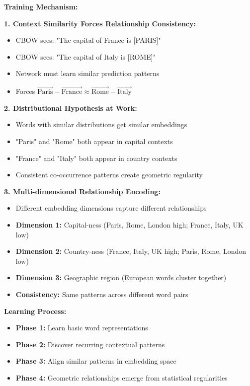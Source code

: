 \documentclass[12pt]{article}
\begin{document}
\begin{enumerate}[(a)]
{    \textbf{Training Mechanism:}
    
    \textbf{1. Context Similarity Forces Relationship Consistency:}
    \begin{itemize}
        \item CBOW sees: "The capital of France is [PARIS]"
        \item CBOW sees: "The capital of Italy is [ROME]"
        \item Network must learn similar prediction patterns
        \item Forces $\vec{\text{Paris}} - \vec{\text{France}} \approx \vec{\text{Rome}} - \vec{\text{Italy}}$
    \end{itemize}
    
    \textbf{2. Distributional Hypothesis at Work:}
    \begin{itemize}
        \item Words with similar distributions get similar embeddings
        \item "Paris" and "Rome" both appear in capital contexts
        \item "France" and "Italy" both appear in country contexts
        \item Consistent co-occurrence patterns create geometric regularity
    \end{itemize}
    
    \textbf{3. Multi-dimensional Relationship Encoding:}
    \begin{itemize}
        \item Different embedding dimensions capture different relationships
        \item \textbf{Dimension 1:} Capital-ness (Paris, Rome, London high; France, Italy, UK low)
        \item \textbf{Dimension 2:} Country-ness (France, Italy, UK high; Paris, Rome, London low)
        \item \textbf{Dimension 3:} Geographic region (European words cluster together)
        \item \textbf{Consistency:} Same patterns across different word pairs
    \end{itemize}
    
    \textbf{Learning Process:}
    \begin{itemize}
        \item \textbf{Phase 1:} Learn basic word representations
        \item \textbf{Phase 2:} Discover recurring contextual patterns
        \item \textbf{Phase 3:} Align similar patterns in embedding space
        \item \textbf{Phase 4:} Geometric relationships emerge from statistical regularities
    \end{itemize}
    
}
\end{enumerate}
\end{document}
